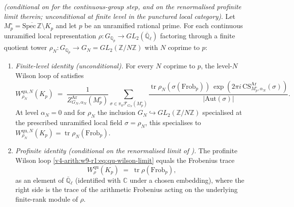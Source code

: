 \begin{theorem}[Wilson line = Frobenius trace on unramified locus]
\label{v4-arith:w9-r1:thm:main}
\ClaimStatusProvedHereConditional \emph{(conditional on
 for the continuous-group step, and
on the renormalised profinite limit therein; unconditional at finite
level in the punctured local category)}. Let
\(M_{p}^{\circ}=\overline{\mathrm{Spec}\,\mathbb Z}\setminus K_{p}\)
and let \(p\) be an unramified rational prime. For each continuous
unramified local representation
\(\rho\colon G_{\mathbb Q_{p}}\to GL_{2}(\overline{\mathbb Q}_{\ell})\)
factoring through a finite quotient tower
\(\rho_{N}\colon G_{\mathbb Q_{p}}\to G_{N}=GL_{2}(\mathbb Z/N\mathbb Z)\)
with \(N\) coprime to \(p\):
\begin{enumerate}
\item \emph{Finite-level identity (unconditional).} For every \(N\)
coprime to \(p\), the level-\(N\) Wilson loop of
 satisfies
\begin{equation}
\label{v4-arith:w9-r1:eq:main-finite}
W^{\mathrm{qu},N}_{\rho_{N}}(K_{p})
\;=\;
\frac{1}{Z^{\mathrm{Ar}}_{G_{N},\alpha_{N}}(M_{p}^{\circ})}
\sum_{\sigma\in\pi_{0}\mathcal F_{G_{N}}(M_{p}^{\circ})}
\frac{\operatorname{tr}\rho_{N}(\sigma(\mathrm{Frob}_{p}))\,
\exp(2\pi i\,\mathrm{CS}^{\mathrm{Ar}}_{M_{p}^{\circ},\alpha_{N}}(\sigma))}
{|\mathrm{Aut}(\sigma)|}.
\end{equation}
At level \(\alpha_{N}=0\) and for \(\rho_{N}\) the inclusion
\(G_{N}\hookrightarrow GL_{2}(\mathbb Z/N\mathbb Z)\) specialised at the
prescribed unramified local field \(\sigma=\rho_{N}\), this specialises to
\(W^{\mathrm{qu},N}_{\rho_{N}}(K_{p})=\operatorname{tr}\rho_{N}(\mathrm{Frob}_{p})\).
\item \emph{Profinite identity (conditional on the renormalised
limit of ).} The
profinite Wilson loop
\eqref{v4-arith:w9-r1:eq:qu-wilson-limit} equals the Frobenius trace
\begin{equation}
\label{v4-arith:w9-r1:eq:main-profinite}
W^{\mathrm{qu}}_{\rho}(K_{p})
\;=\;\operatorname{tr}\rho(\mathrm{Frob}_{p}),
\end{equation}
as an element of \(\overline{\mathbb Q}_{\ell}\) (identified with
\(\mathbb C\) under a chosen embedding), where the right side is the
trace of the arithmetic Frobenius acting on the underlying finite-rank
module of \(\rho\).
\end{enumerate}
\end{theorem}

